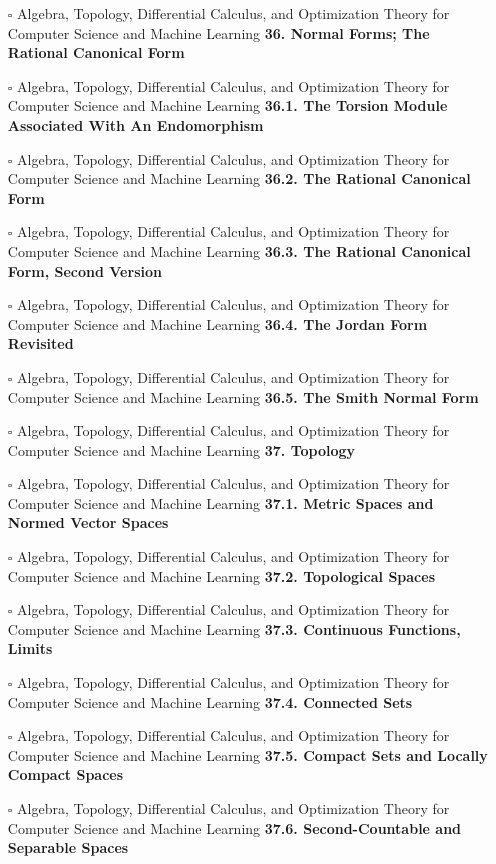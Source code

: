 \documentclass[a4, landscape, 12pt]{article}
\newcommand{\checkbox}{$\square$}%
\begin{document}
\begin{itemize}
{}
\item [\checkbox]  Algebra, Topology, Differential Calculus, and Optimization Theory for Computer Science and Machine Learning \textbf{ 36. Normal Forms; The Rational Canonical Form
}
\item [\checkbox]  Algebra, Topology, Differential Calculus, and Optimization Theory for Computer Science and Machine Learning \textbf{ 36.1. The Torsion Module Associated With An Endomorphism
}
\item [\checkbox]  Algebra, Topology, Differential Calculus, and Optimization Theory for Computer Science and Machine Learning \textbf{ 36.2. The Rational Canonical Form
}
\item [\checkbox]  Algebra, Topology, Differential Calculus, and Optimization Theory for Computer Science and Machine Learning \textbf{ 36.3. The Rational Canonical Form, Second Version
}
\item [\checkbox]  Algebra, Topology, Differential Calculus, and Optimization Theory for Computer Science and Machine Learning \textbf{ 36.4. The Jordan Form Revisited
}
\item [\checkbox]  Algebra, Topology, Differential Calculus, and Optimization Theory for Computer Science and Machine Learning \textbf{ 36.5. The Smith Normal Form
}
\item [\checkbox]  Algebra, Topology, Differential Calculus, and Optimization Theory for Computer Science and Machine Learning \textbf{ 37. Topology
}
\item [\checkbox]  Algebra, Topology, Differential Calculus, and Optimization Theory for Computer Science and Machine Learning \textbf{ 37.1. Metric Spaces and Normed Vector Spaces
}
\item [\checkbox]  Algebra, Topology, Differential Calculus, and Optimization Theory for Computer Science and Machine Learning \textbf{ 37.2. Topological Spaces
}
\item [\checkbox]  Algebra, Topology, Differential Calculus, and Optimization Theory for Computer Science and Machine Learning \textbf{ 37.3. Continuous Functions, Limits
}
\item [\checkbox]  Algebra, Topology, Differential Calculus, and Optimization Theory for Computer Science and Machine Learning \textbf{ 37.4. Connected Sets
}
\item [\checkbox]  Algebra, Topology, Differential Calculus, and Optimization Theory for Computer Science and Machine Learning \textbf{ 37.5. Compact Sets and Locally Compact Spaces
}
\item [\checkbox]  Algebra, Topology, Differential Calculus, and Optimization Theory for Computer Science and Machine Learning \textbf{ 37.6. Second-Countable and Separable Spaces
}
\end{itemize}
\end{document}
